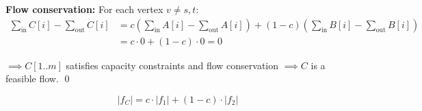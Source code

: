 \documentclass[11pt]{article}
\begin{document}
\textbf{Flow conservation:} For each vertex $v \ne s, t$:
\begin{align*}
\sum_{\text{in}} C[i] - \sum_{\text{out}} C[i]
&= c\!\left(\sum_{\text{in}} A[i] - \sum_{\text{out}} A[i]\right) + (1-c)\!\left(\sum_{\text{in}} B[i] - \sum_{\text{out}} B[i]\right) \\
&= c \cdot 0 + (1-c) \cdot 0 = 0
\end{align*}

$\implies C[1..m]$ satisfies capacity constraints and flow conservation $\implies C$ is a feasible flow. \qed

\[\boxed{|f_C| = c \cdot |f_1| + (1-c) \cdot |f_2|}\]
\end{document}
